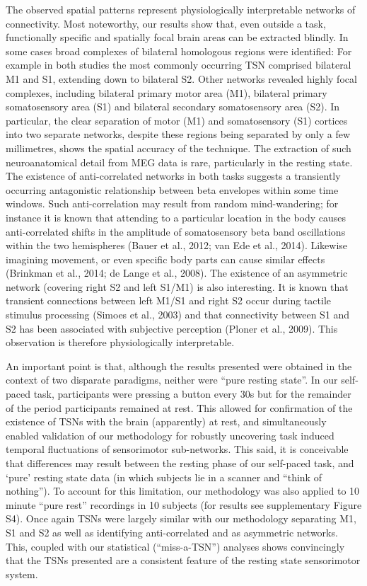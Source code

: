 The observed spatial patterns represent physiologically interpretable networks of connectivity. Most noteworthy, our results show that, even outside a task, functionally specific and spatially focal brain areas can be extracted blindly. In some cases broad complexes of bilateral homologous regions were identified: For example in both studies the most commonly occurring TSN comprised bilateral M1 and S1, extending down to bilateral S2. Other networks revealed highly focal complexes, including bilateral primary motor area (M1), bilateral primary somatosensory area (S1) and bilateral secondary somatosensory area (S2). In particular, the clear separation of motor (M1) and somatosensory (S1) cortices into two separate networks, despite these regions being separated by only a few millimetres, shows the spatial accuracy of the technique. The extraction of such neuroanatomical detail from MEG data is rare, particularly in the resting state. The existence of anti-correlated networks in both tasks suggests a transiently occurring antagonistic relationship between beta envelopes within some time windows. Such anti-correlation may result from random mind-wandering; for instance it is known that attending to a particular location in the body causes anti-correlated shifts in the amplitude of somatosensory beta band oscillations within the two hemispheres (Bauer et al., 2012; van Ede et al., 2014). Likewise imagining movement, or even specific body parts can cause similar effects (Brinkman et al., 2014; de Lange et al., 2008). The existence of an asymmetric network (covering right S2 and left S1/M1) is also interesting. It is known that transient connections between left M1/S1 and right S2 occur during tactile stimulus processing (Simoes et al., 2003) and that connectivity between S1 and S2 has been associated with subjective perception (Ploner et al., 2009). This observation is therefore physiologically interpretable. 

An important point is that, although the results presented were obtained in the context of two disparate paradigms, neither were “pure resting state”. In our self-paced task, participants were pressing a button every 30s but for the remainder of the period participants remained at rest. This allowed for confirmation of the existence of TSNs with the brain (apparently) at rest, and simultaneously enabled validation of our methodology for robustly uncovering task induced temporal fluctuations of sensorimotor sub-networks. This said, it is conceivable that differences may result between the resting phase of our self-paced task, and ‘pure’ resting state data (in which subjects lie in a scanner and “think of nothing”). To account for this limitation, our methodology was also applied to 10 minute “pure rest” recordings in 10 subjects (for results see supplementary Figure S4). Once again TSNs were largely similar with our methodology separating M1, S1 and S2 as well as identifying anti-correlated and as asymmetric networks. This, coupled with our statistical (“miss-a-TSN”) analyses shows convincingly that the TSNs presented are a consistent feature of the resting state sensorimotor system.

